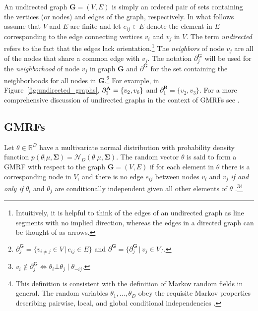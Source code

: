  An undirected graph $\mathbf{G} = (V,E)$ is simply an ordered pair of sets containing the vertices (or nodes) and edges of the graph, respectively. In what follows assume that $V$ and $E$ are finite and let $e_{ij} \in E$ denote the element in $E$ corresponding to the edge connecting vertices $v_i$ and $v_j$ in $V$. The term {\it undirected} refers to the fact that the edges lack orientation.\footnote{Intuitively, it is helpful to think of the edges of an undirected graph as line segments with no implied direction, whereas the edges in a directed graph can be thought of as arrows.} The {\it neighbors} of node $v_j$ are all of the nodes that share a common edge with $v_j$. The notation $\partial^{\mathbf{G}}_j$ will be used for the {\it neighborhood} of node $v_j$ in graph  $\mathbf{G}$ and $\partial^\mathbf{G}$ for the set containing the neighborhoods for all nodes in $\mathbf{G}$.\footnote{$ \partial^\mathbf{G}_j = \{v_{i \neq j} \in V \,\vert\, e_{ij} \in E\}$ and $\partial^\mathbf{G} = \{\partial^\mathbf{G}_j \,\vert\, v_j \in V\}$.} For example, in Figure~\ref{fig:undirected_graphs}, $\partial^{\mathbf{A}}_1 = \{v_2, v_6\}$ and $\partial^{\mathbf{B}}_1 = \{v_2, v_3\}$.  For a more comprehensive discussion of undirected graphs in the context of GMRFs see . 
 

\subsection{GMRFs}
Let $\theta \in \mathbb{R}^D$ have a multivariate normal distribution with probability density function $p(\theta | \mu, \boldsymbol{\Sigma}) = \mathcal{N}_D (\theta | \mu, \boldsymbol{\Sigma})$. The random vector $\theta$ is said to form a GMRF with respect to the graph $\mathbf{G} = (V,E)$ if for each element in $\theta$ there is a corresponding node in $V$, and there is no edge $e_{ij}$ between nodes $v_i$ and $v_j$ \emph{if and only if} $\theta_i$ and $\theta_j$ are conditionally independent given all other elements of $\theta$ .\footnote{$v_i \notin \partial^\mathbf{G}_{j} \iff \theta_i \bot \theta_j \mid \theta_{-ij}.$}\footnote{This definition is consistent with the definition of Markov random fields in general. The random variables $\theta_1, \dots, \theta_D$ obey the requisite Markov properties describing pairwise, local, and global conditional independencies .} 

